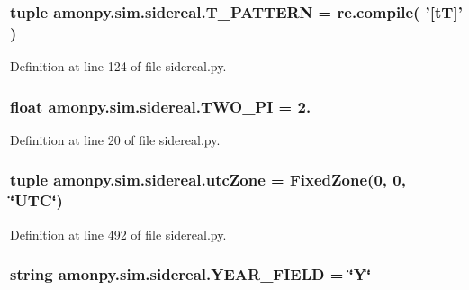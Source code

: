\hypertarget{namespaceamonpy_1_1sim_1_1sidereal_aeca578cc76ae401d8eaaaa9ce6c0ed47}{
\subsubsection[{T\-\_\-\-P\-A\-T\-T\-E\-R\-N}]{\setlength{\rightskip}{0pt plus 5cm}tuple amonpy.\-sim.\-sidereal.\-T\-\_\-\-P\-A\-T\-T\-E\-R\-N = re.\-compile( '\mbox{[}t\-T\mbox{]}' )}}\label{namespaceamonpy_1_1sim_1_1sidereal_aeca578cc76ae401d8eaaaa9ce6c0ed47}


Definition at line 124 of file sidereal.\-py.

\hypertarget{namespaceamonpy_1_1sim_1_1sidereal_a2c8d9a578f93121ccd945504ac583f03}{
\subsubsection[{T\-W\-O\-\_\-\-P\-I}]{\setlength{\rightskip}{0pt plus 5cm}float amonpy.\-sim.\-sidereal.\-T\-W\-O\-\_\-\-P\-I = 2.}}\label{namespaceamonpy_1_1sim_1_1sidereal_a2c8d9a578f93121ccd945504ac583f03}


Definition at line 20 of file sidereal.\-py.

\hypertarget{namespaceamonpy_1_1sim_1_1sidereal_a08eaf9ec6406ff09c3029f019cdd10f9}{
\subsubsection[{utc\-Zone}]{\setlength{\rightskip}{0pt plus 5cm}tuple amonpy.\-sim.\-sidereal.\-utc\-Zone = {\bf Fixed\-Zone}(0, 0, \char`\"{}U\-T\-C\char`\"{})}}\label{namespaceamonpy_1_1sim_1_1sidereal_a08eaf9ec6406ff09c3029f019cdd10f9}


Definition at line 492 of file sidereal.\-py.

\hypertarget{namespaceamonpy_1_1sim_1_1sidereal_a066da938654a2cfd3ad8822f3b902391}{
\subsubsection[{Y\-E\-A\-R\-\_\-\-F\-I\-E\-L\-D}]{\setlength{\rightskip}{0pt plus 5cm}string amonpy.\-sim.\-sidereal.\-Y\-E\-A\-R\-\_\-\-F\-I\-E\-L\-D = \char`\"{}Y\char`\"{}}}\label{namespaceamonpy_1_1sim_1_1sidereal_a066da938654a2cfd3ad8822f3b902391}


